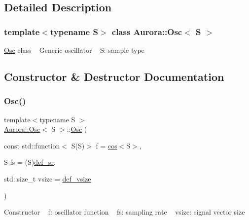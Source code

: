 \subsection{Detailed Description}
\subsubsection*{template$<$typename S$>$\newline
class Aurora\+::\+Osc$<$ S $>$}

\hyperlink{class_aurora_1_1_osc}{Osc} class ~\newline
Generic oscillator ~\newline
S\+: sample type 

\subsection{Constructor \& Destructor Documentation}
\mbox{\label{class_aurora_1_1_osc_aca573068f8919635cfca278c7b087e38}} 
\subsubsection{\texorpdfstring{Osc()}{Osc()}}
{\footnotesize\ttfamily template$<$typename S $>$ \\
\hyperlink{class_aurora_1_1_osc}{Aurora\+::\+Osc}$<$ S $>$\+::\hyperlink{class_aurora_1_1_osc}{Osc} (\begin{DoxyParamCaption}\item[{const std\+::function$<$ S(S)$>$}]{f = {\ttfamily \hyperlink{namespace_aurora_ab6ef1b966b8f27d107fcabe1027a677a}{cos}$<$S$>$},  }\item[{S}]{fs = {\ttfamily (S)\hyperlink{namespace_aurora_ad49263d809bea98dd422e95bc91bc03e}{def\+\_\+sr}},  }\item[{std\+::size\+\_\+t}]{vsize = {\ttfamily \hyperlink{namespace_aurora_afaaddf667a06e7ce23c667a8b7295263}{def\+\_\+vsize}} }\end{DoxyParamCaption})\hspace{0.3cm}{\ttfamily [inline]}}

Constructor ~\newline
f\+: oscillator function ~\newline
fs\+: sampling rate ~\newline
vsize\+: signal vector size \mbox{\label{class_aurora_1_1_osc_a95062ac1670f5de00a27c33bfb4eb117}} 
